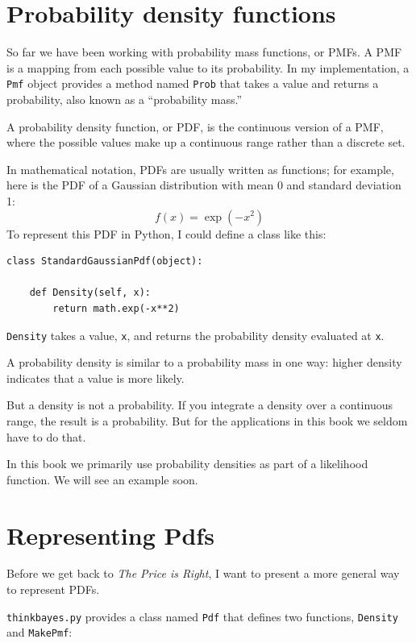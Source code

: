 \documentclass[12pt]{book}
\begin{document}
\section{Probability density functions}

So far we have been working with probability mass functions, or PMFs.
A PMF is a mapping from each possible value to its probability.  In my
implementation, a {\tt Pmf} object provides a method named {\tt Prob} that
takes a value and returns a probability, also known as a ``probability
mass.''

A probability density function, or PDF, is the continuous version of a
PMF, where the possible values make up a continuous range rather than
a discrete set.  

In mathematical notation, PDFs are usually written as functions; for
example, here is the PDF of a Gaussian distribution with
mean 0 and standard deviation 1:
%
\[ f(x) = \exp(-x^2) \]
%
To represent this PDF in Python, I could define a class like this:

\begin{verbatim}
class StandardGaussianPdf(object):

    def Density(self, x):
        return math.exp(-x**2)
\end{verbatim}

{\tt Density} takes a value, {\tt x}, and returns the probability
density evaluated at {\tt x}.  

A probability density is similar
to a probability mass in one way: higher density indicates that a
value is more likely.

But a density is not a probability.  If you integrate a density
over a continuous range, the result is a probability.  But 
for the applications in this book we seldom have to do that.

In this book we primarily use probability densities as part
of a likelihood function.  We will see an example soon.


\section{Representing Pdfs}

Before we get back to {\it The Price is Right}, I want to
present a more general way to represent PDFs.

{\tt thinkbayes.py} provides a class named {\tt Pdf} that defines
two functions, {\tt Density} and {\tt MakePmf}:
\end{document}
